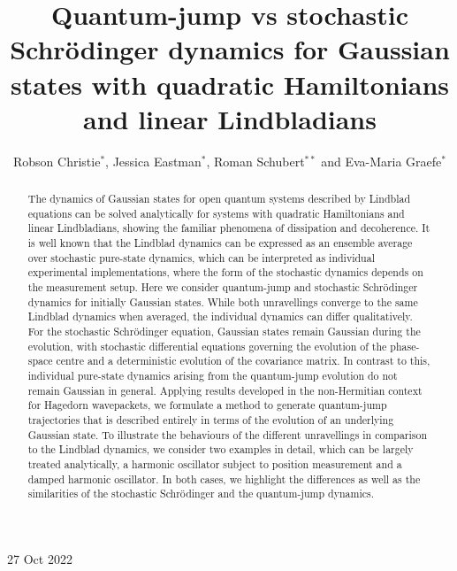 \documentclass[12pt]{iopart} %
\begin{document}
\title[Quantum-jump vs stochastic Schr\"odinger dynamics]{Quantum-jump vs stochastic Schr\"odinger dynamics for Gaussian states with quadratic Hamiltonians and linear Lindbladians}
\author{Robson Christie$^*$, Jessica Eastman$^*$, Roman Schubert$^{**}$ and Eva-Maria Graefe$^*$}
\address{$^*$Department of Mathematics, Imperial College London, London SW7 2AZ,
United Kingdom}
\address{$^{**}$School of Mathematics, University of Bristol, Bristol, BS8 1TW, United Kingdom}
\vspace{10pt}
\begin{indented}
\item[]27 Oct 2022
\end{indented}

\begin{abstract}
The dynamics of Gaussian states for open quantum systems described by Lindblad equations can be solved analytically for systems with quadratic Hamiltonians and linear Lindbladians, showing the familiar phenomena of dissipation and decoherence. It is well known that the Lindblad dynamics can be expressed as an ensemble average over stochastic pure-state dynamics, which can be interpreted as individual experimental implementations, where the form of the stochastic dynamics depends on the measurement setup. Here we consider quantum-jump and stochastic Schr\"odinger dynamics for initially Gaussian states. While both unravellings converge to the same Lindblad dynamics when averaged, the individual dynamics can differ qualitatively. For the stochastic Schr\"odinger equation, Gaussian states remain Gaussian during the evolution, with stochastic differential equations governing the evolution of the phase-space centre and a deterministic evolution of the covariance matrix. In contrast to this, individual pure-state dynamics arising from the quantum-jump evolution do not remain Gaussian in general. Applying results developed in the non-Hermitian context for Hagedorn wavepackets, we formulate a method to generate quantum-jump trajectories that is described entirely in terms of the evolution of an underlying Gaussian state. To illustrate the behaviours of the different unravellings in comparison to the Lindblad dynamics, we consider two examples in detail, which can be largely treated analytically, a harmonic oscillator subject to position measurement and a damped harmonic oscillator. In both cases, we highlight the differences as well as the similarities of the stochastic Schr\"odinger and the quantum-jump dynamics.
\end{abstract}
\end{document}
